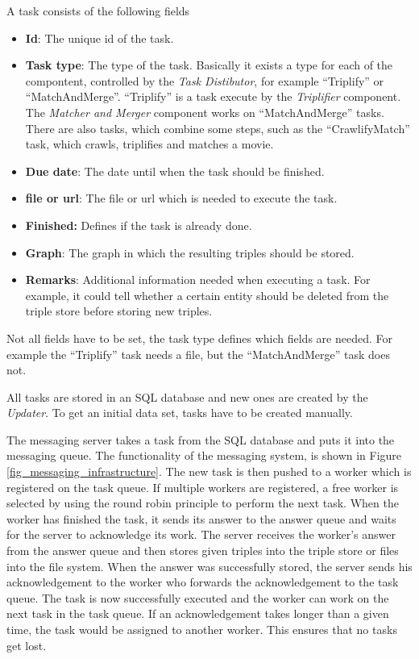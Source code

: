 A task consists of the following fields
\begin{itemize}
  \item \textbf{Id}:
  The unique id of the task.
  \item \textbf{Task type}:
   The type of the task.
  Basically it exists a type for each of the compontent, controlled by the \textit{Task Distibutor}, for example ``Triplify'' or ``MatchAndMerge''.
  ``Triplify'' is a task execute by the \textit{Triplifier} component.
  The \textit{Matcher and Merger} component works on ``MatchAndMerge'' tasks.
  There are also tasks, which combine some steps, such as the ``CrawlifyMatch'' task, which crawls, triplifies and matches a movie.
  \item \textbf{Due date}:
  The date until when the task should be finished.
  \item \textbf{file or url}:
  The file or url which is needed to execute the task.
  \item \textbf{Finished:}
  Defines if the task is already done.
  \item \textbf{Graph}:
  The graph in which the resulting triples should be stored.
  \item \textbf{Remarks}:
  Additional information needed when executing a task.
  For example, it could tell whether a certain entity should be deleted from the triple store before storing new triples.
\end{itemize}
Not all fields have to be set, the task type defines which fields are needed.
For example the ``Triplify'' task needs a file, but the ``MatchAndMerge'' task does not.

All tasks are stored in an SQL database and new ones are created by the \textit{Updater}.
To get an initial data set, tasks have to be created manually.

The messaging server takes a task from the SQL database and puts it into the messaging queue.
The functionality of the messaging system, is shown in Figure \ref{fig_messaging_infrastructure}.
The new task is then pushed to a worker which is registered on the task queue.
If multiple workers are registered, a free worker is selected by using the round robin principle to perform the next task.
When the worker has finished the task, it sends its answer to the answer queue and waits for the server to acknowledge its work.
The server receives the worker's answer from the answer queue and then stores given triples into the triple store or files into the file system.
When the answer was successfully stored, the server sends his acknowledgement to the worker who forwards the acknowledgement to the task queue.
The task is now successfully executed and the worker can work on the next task in the task queue.
If an acknowledgement takes longer than a given time, the task would be assigned to another worker.
This ensures that no tasks get lost.

